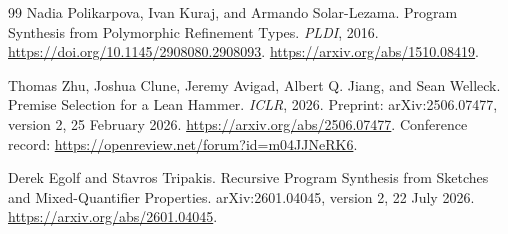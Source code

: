 \begin{thebibliography}{99}
 Nadia Polikarpova, Ivan Kuraj, and Armando Solar-Lezama.
Program Synthesis from Polymorphic Refinement Types.
\emph{PLDI}, 2016.
\url{https://doi.org/10.1145/2908080.2908093}.
\url{https://arxiv.org/abs/1510.08419}.

 Thomas Zhu, Joshua Clune, Jeremy Avigad, Albert Q. Jiang, and Sean Welleck.
Premise Selection for a Lean Hammer.
\emph{ICLR}, 2026.
Preprint: arXiv:2506.07477, version 2, 25 February 2026.
\url{https://arxiv.org/abs/2506.07477}.
Conference record: \url{https://openreview.net/forum?id=m04JJNeRK6}.

 Derek Egolf and Stavros Tripakis.
Recursive Program Synthesis from Sketches and Mixed-Quantifier Properties.
arXiv:2601.04045, version 2, 22 July 2026.
\url{https://arxiv.org/abs/2601.04045}.

\end{thebibliography}
